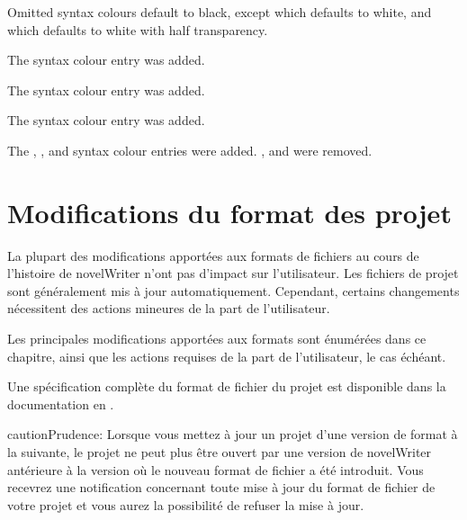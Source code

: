 \documentclass[a4paper,11pt,french]{sphinxmanual}
\begin{document}
\sphinxAtStartPar
Omitted syntax colours default to black, except  which defaults to white, and
 which defaults to white with half transparency.

\sphinxAtStartPar
{}The  syntax colour entry was added.

\sphinxAtStartPar
{}The  syntax colour entry was added.

\sphinxAtStartPar
{}The  syntax colour entry was added.

\sphinxAtStartPar
{}The , ,  and  syntax colour entries were added.
,  and  were removed.

\sphinxstepscope


\chapter{Modifications du format des projet}
\label{\detokenize{more_projectformat:project-format-changes}}\label{\detokenize{more_projectformat:a-prjfmt}}\label{\detokenize{more_projectformat::doc}}
\sphinxAtStartPar
La plupart des modifications apportées aux formats de fichiers au cours de l’histoire de novelWriter n’ont pas d’impact sur l’utilisateur. Les fichiers de projet sont généralement mis à jour automatiquement. Cependant, certains changements nécessitent des actions mineures de la part de l’utilisateur.

\sphinxAtStartPar
Les principales modifications apportées aux formats sont énumérées dans ce chapitre, ainsi que les actions requises de la part de l’utilisateur, le cas échéant.

\sphinxAtStartPar
Une spécification complète du format de fichier du projet est disponible dans la documentation en .

\begin{sphinxadmonition}{caution}{Prudence:}
\sphinxAtStartPar
Lorsque vous mettez à jour un projet d’une version de format à la suivante, le projet ne peut plus être ouvert par une version de novelWriter antérieure à la version où le nouveau format de fichier a été introduit. Vous recevrez une notification concernant toute mise à jour du format de fichier de votre projet et vous aurez la possibilité de refuser la mise à jour.
\end{sphinxadmonition}
\end{document}
